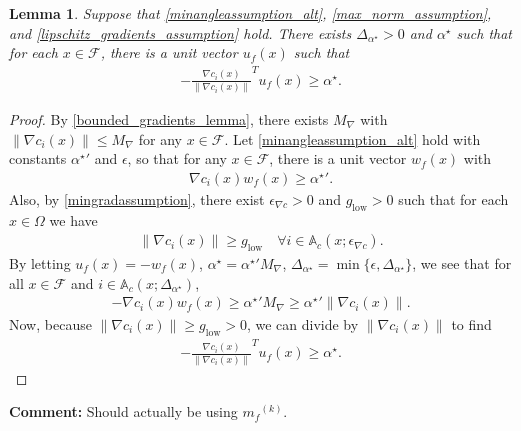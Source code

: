 \documentclass{article}
\newenvironment{comment}
  {\par\medskip
   \color{red}%
   \begin{framed}
   \textbf{Comment: }\ignorespaces}
 {\end{framed}
  \medskip}
\newtheorem{lemma}[theorem]{Lemma}
\theoremstyle{case}
\numberwithin{theorem}{subsection}
\newcommand{\abuf}{{\alpha_{\text{buffer}}}}
\newcommand{\atr}{{A_{\textrm{TR}}}}
\newcommand{\atrk}{{A^{(k)}_{\textrm{TR}}}}
\newcommand{\btr}{{b_{\text{TR}}}}
\newcommand{\btrk}{{b^{(k)}_{\textrm{TR}}}}
\newcommand{\domain}{{\mathcal X}}
\newcommand{\feasible}{{\mathcal F}}
\newcommand{\maxgrad}{{M_{\nabla}}}
\newcommand{\mfk}{{{m}_f}^{(k)}}
\newcommand{\minanglealpha}{{ \alpha^{\star} }}
\newcommand{\minangledelta}{{\Delta_{\alpha^{\star}}}}
\newcommand{\mingradepsilon}{{\epsilon_{\nabla c}}}
\newcommand{\mingrad}{{ g_{\textrm{low}} }}
\newcommand{\oalpha}{\tau_{\Delta}}
\newcommand{\polydn}{\mathcal{P}^d_n}
\newcommand{\reg}{{\delta_{\textrm{reg}}}}
\newcommand{\trsinfset}{{E_\textrm{infeasible}}}
\newcommand{\trstol}{{\delta_\textrm{infeasible}}}
\newcommand{\ximin}{\xi_{\text{min}}}
\newcommand{\minanglediralt}{{w_f}}
\newcommand{\minangledir}{{u_f}}
\newcommand{\epsactive}{{\mathbb A_c}}
\begin{document}
\color{red}
\begin{lemma}
\label{minanglelemmap1}
Suppose that \cref{minangleassumption_alt}, \cref{max_norm_assumption}, and \cref{lipschitz_gradients_assumption} hold.
There exists $\minangledelta > 0$ and $\minanglealpha$ such that for each $x \in \feasible$, there is a unit vector $\minangledir(x)$ such that
\begin{align*}
-\frac {\nabla c_i(x)}{\|\nabla c_i(x)\|}^T \minangledir(x) \ge \minanglealpha.
\end{align*}
\end{lemma}
\begin{proof}
By \cref{bounded_gradients_lemma}, there exists $\maxgrad$ with $\|\nabla c_i(x) \| \le \maxgrad$ for any $x \in \feasible$.
Let \cref{minangleassumption_alt} hold with constants $\minanglealpha'$ and $\epsilon$, so that for any $x \in \feasible$, there is a unit vector $\minanglediralt(x)$ with
\begin{align*}
\nabla c_i(x)\minanglediralt(x) \ge \minanglealpha'.
\end{align*}
Also, by \cref{mingradassumption}, there exist $\mingradepsilon > 0$ and $\mingrad > 0$ such that for each $x \in \Omega$ we have
\begin{align*}
\| \nabla c_i(x) \| \ge \mingrad \quad \forall i \in \epsactive(x; \mingradepsilon).
\end{align*}
By letting $\minangledir(x) = -\minanglediralt(x)$, $\minanglealpha = \minanglealpha'\maxgrad$, $\minangledelta = \min\{\epsilon, \minangledelta\}$, 
we see that for all $x \in \feasible$ and $i \in \epsactive(x; \minangledelta)$,
\begin{align*}
-\nabla c_i(x) \minanglediralt(x) \ge \minanglealpha'\maxgrad \ge \minanglealpha'\|\nabla c_i(x)\|.
\end{align*}
Now, because $\| \nabla c_i(x) \| \ge \mingrad > 0$, we can divide by $\| \nabla c_i(x) \|$ to find
\begin{align*}
-\frac {\nabla c_i(x)}{\|\nabla c_i(x)\|}^T \minangledir(x) \ge \minanglealpha.
\end{align*}
\end{proof}
\color{black}


\appendix


\begin{comment}
Should actually be using $\mfk$.
\end{comment}

\end{document}
